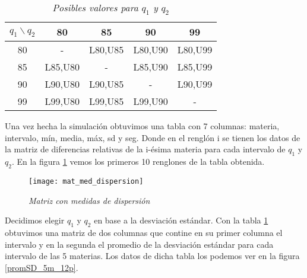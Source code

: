 \begin{table}[H]
\centering
\begin{tabular}{|c|c|c|c|c|}
\hline 
$q_{1} \backslash q_{2}$ & 80 & 85 & 90 & 99 \\ 
\hline 
80 & - & L80,U85 & L80,U90 & L80,U99 \\ 
\hline 
85 & L85,U80 & - & L85,U90 & L85,U99 \\ 
\hline 
90 & L90,U80 & L90,U85 & - & L90,U99 \\ 
\hline 
99 & L99,U80 & L99,U85 & L99,U90 & - \\ 
\hline 
\end{tabular} 
\caption{\textit{Posibles valores para $q_{1}$ y $q_{2}$}}\label{valoresQ1Q2}
\end{table}


Una vez hecha la simulación obtuvimos una tabla con 7 columnas: materia, intervalo, mín, media, máx, sd y seg. Donde en el renglón i se tienen los datos de la matriz de diferencias relativas de la i-ésima materia para cada intervalo de $q_{1}$ y $q_{2}$. En la figura \ref{matMedDispersion} vemos los primeros 10 renglones de la tabla obtenida.

\begin{figure}[H]
\centering
\texttt{[image: mat\_med\_dispersion]} %
\caption{\textit{Matriz con medidas de dispersión}}\label{matMedDispersion}
\end{figure}


Decidimos elegir $q_{1}$ y $q_{2}$ en base a la desviación estándar. Con la tabla \ref{matMedDispersion} obtuvimos una matriz de dos columnas que contine en su primer columna el intervalo y en la segunda el promedio de la desviación estándar para cada intervalo de las 5 materias. Los datos de dicha tabla los podemos ver en la figura \ref{promSD_5m_12p}.



